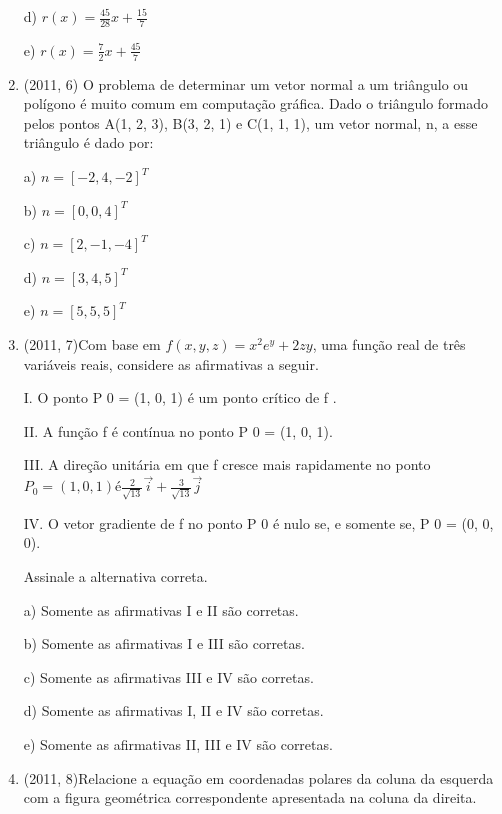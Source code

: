 \documentclass{article}
\begin{document}
\begin{enumerate}
d) $r(x) =\frac{45}{28}x + \frac{15}{7}$

e) $r(x) =\frac{7}{2}x + \frac{45}{7}$\newline








\item(2011, 6) O problema de determinar um vetor normal a um triângulo ou polígono é muito comum em computação gráfica. Dado o triângulo formado pelos pontos A(1, 2, 3), B(3, 2, 1) e C(1, 1, 1), um vetor normal, n, a esse triângulo é dado por:

a) $n = [-2, 4, -2]^T$

b) $n = [0, 0, 4]^T$

c) $n = [2, -1, -4]^T$

d) $n = [3, 4, 5]^T$

e) $n = [5, 5, 5]^T$ \newline








\item(2011, 7)Com base em $f (x, y, z) = x^2 e^y + 2zy$, uma função real de três variáveis reais, considere as afirmativas a seguir.


I. O ponto P 0 = (1, 0, 1) é um ponto crítico de f .

II. A função f é contínua no ponto P 0 = (1, 0, 1).

III. A direção unitária em que f cresce mais rapidamente no ponto $P_0 = (1, 0, 1) é \frac{2}{\sqrt{13}} \vec i + \frac{3}{\sqrt{13}}\vec j$

IV. O vetor gradiente de f no ponto P 0 é nulo se, e somente se, P 0 = (0, 0, 0).

Assinale a alternativa correta.

a) Somente as afirmativas I e II são corretas.

b) Somente as afirmativas I e III são corretas.

c) Somente as afirmativas III e IV são corretas.

d) Somente as afirmativas I, II e IV são corretas.

e) Somente as afirmativas II, III e IV são corretas.\newline







\item(2011, 8)Relacione a equação em coordenadas polares da coluna da esquerda com a figura geométrica correspondente apresentada na coluna da direita.



\end{enumerate}
\end{document}

